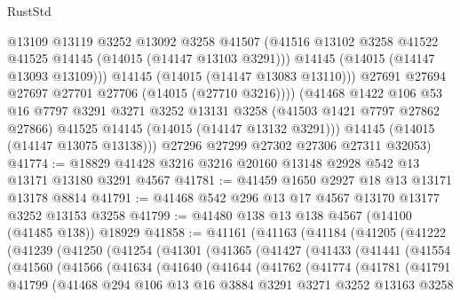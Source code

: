 \begin{lexlean}{RustStd}
\begin{coremodule}
                @13109
                @13119
                @3252
                @13092
                @3258
                @41507
                (@41516 @13102 @3258 @41522 @41525 @14145 (@14015 (@14147 @13103 @3291)))
                @14145
                (@14015 (@14147 @13093 @13109)))
              @14145
              (@14015 (@14147 @13083 @13110)))
            @27691
            @27694
            @27697
            @27701
            @27706
            (@14015 (@27710 @3216))))
        (@41468
          @1422
          @106
          @53
          @16
          @7797
          @3291
          @3271
          @3252
          @13131
          @3258
          (@41503 @1421 @7797 @27862 @27866)
          @41525
          @14145
          (@14015 (@14147 @13132 @3291)))
        @14145
        (@14015 (@14147 @13075 @13138)))
      @27296
      @27299
      @27302
      @27306
      @27311
      @32053)
@41774 := @18829 @41428 @3216 @3216 @20160 @13148 @2928 @542 @13 @13171 @13180 @3291 @4567
@41781 := @41459 @1650 @2927 @18 @13 @13171 @13178 @8814
@41791 := @41468 @542 @296 @13 @17 @4567 @13170 @13177 @3252 @13153 @3258
@41799 := @41480 @138 @13 @138 @4567 (@14100 (@41485 @138)) @18929
@41858 := @41161
    (@41163
      (@41184
        (@41205
          (@41222
            (@41239
              (@41250
                (@41254
                  (@41301
                    (@41365
                      (@41427
                        (@41433
                          (@41441
                            (@41554
                              (@41560
                                (@41566
                                  (@41634
                                    (@41640
                                      (@41644
                                        (@41762
                                          (@41774
                                            (@41781
                                              (@41791
                                                @41799
                                                (@41468
                                                  @294
                                                  @106
                                                  @13
                                                  @16
                                                  @3884
                                                  @3291
                                                  @3271
                                                  @3252
                                                  @13163
                                                  @3258

\end{coremodule}
\end{lexlean}
